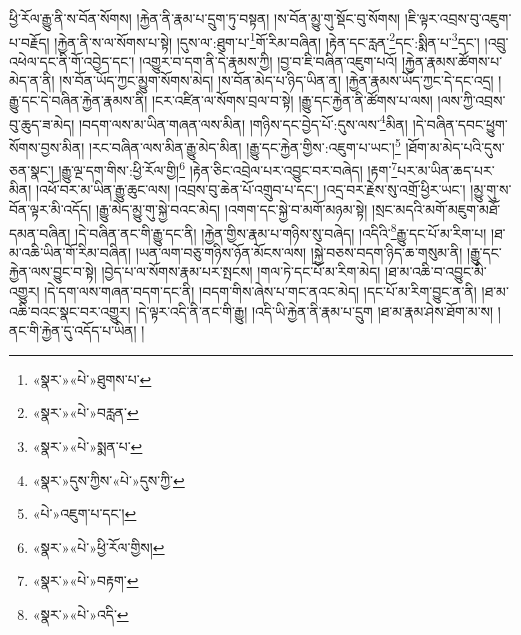 ཕྱི་རོལ་རྒྱུ་ནི་ས་བོན་སོགས། །རྐྱེན་ནི་རྣམ་པ་དྲུག་ཏུ་བསྟན། །ས་བོན་མྱུ་གུ་སྡོང་བུ་སོགས། །ཇི་ལྟར་འབྲས་བུ་འཇུག་པ་བརྗོད། །རྐྱེན་ནི་ས་ལ་སོགས་པ་སྟེ། །དུས་ལ་:ཐུག་པ་\footnote{«སྣར་»«པེ་»ཐུགས་པ་}གོ་རིམ་བཞིན། །རྟེན་དང་རླན་\footnote{«སྣར་»«པེ་»བརླན་}དང་:སྨིན་པ་\footnote{«སྣར་»«པེ་»སྨན་པ་}དང་། །འབྲུ་འཕེལ་དང་ནི་གོ་འབྱེད་དང་། །འགྱུར་བ་དག་ནི་དེ་རྣམས་ཀྱི། །བྱ་བ་ཇི་བཞིན་འཇུག་པའོ། །རྐྱེན་རྣམས་ཚོགས་པ་མེད་ན་ནི། །ས་བོན་ཡོད་ཀྱང་མྱུག་སོགས་མེད། །ས་བོན་མེད་པ་ཉིད་ཡིན་ན། །རྐྱེན་རྣམས་ཡོད་ཀྱང་དེ་དང་འདྲ། །རྒྱུ་དང་དེ་བཞིན་རྐྱེན་རྣམས་ནི། །ངར་འཛིན་ལ་སོགས་བྲལ་བ་སྟེ། །རྒྱུ་དང་རྐྱེན་ནི་ཚོགས་པ་ལས། །ལས་ཀྱི་འབྲས་བུ་ཆུད་ཟ་མེད། །བདག་ལས་མ་ཡིན་གཞན་ལས་མིན། །གཉིས་དང་བྱེད་པོ་:དུས་ལས་\footnote{«སྣར་»དུས་ཀྱིས་«པེ་»དུས་ཀྱི་}མིན། །དེ་བཞིན་དབང་ཕྱུག་སོགས་བྱས་མིན། །རང་བཞིན་ལས་མིན་རྒྱུ་མེད་མིན། །རྒྱུ་དང་རྐྱེན་གྱིས་:འཇུག་པ་ཡང་།\footnote{«པེ་»འཇུག་པ་དང་།} །ཐོག་མ་མེད་པའི་དུས་ཅན་སྣང་། །རྒྱུ་ལྔ་དག་གིས་:ཕྱི་རོལ་གྱི།\footnote{«སྣར་»«པེ་»ཕྱི་རོལ་གྱིས།} །རྟེན་ཅིང་འབྲེལ་པར་འབྱུང་བར་བཞེད། །རྟག་\footnote{«སྣར་»«པེ་»བརྟག་}པར་མ་ཡིན་ཆད་པར་མིན། །འཕོ་བར་མ་ཡིན་རྒྱུ་ཆུང་ལས། །འབྲས་བུ་ཆེན་པོ་འགྲུབ་པ་དང་། །འདྲ་བར་རྗེས་སུ་འགྲོ་ཕྱིར་ཡང་། །མྱུ་གུ་ས་བོན་ལྟར་མི་འདོད། །རྒྱུ་མེད་མྱུ་གུ་སྐྱེ་བའང་མེད། །འགག་དང་སྐྱེ་བ་མགོ་མཉམ་སྟེ། །སྲང་མདའི་མགོ་མཇུག་མཐོ་དམན་བཞིན། །དེ་བཞིན་ནང་གི་རྒྱུ་དང་ནི། །རྐྱེན་གྱིས་རྣམ་པ་གཉིས་སུ་བཞེད། །འདིའི་\footnote{«སྣར་»«པེ་»འདི་}རྒྱུ་དང་པོ་མ་རིག་པ། །ཐ་མ་འཆི་ཡིན་གོ་རིམ་བཞིན། །ཡན་ལག་བཅུ་གཉིས་ཉོན་མོངས་ལས། །སྐྱེ་བཅས་བདག་ཉིད་ཆ་གསུམ་ནི། །རྒྱུ་དང་རྐྱེན་ལས་བྱུང་བ་སྟེ། །བྱེད་པ་ལ་སོགས་རྣམ་པར་སྤངས། །གལ་ཏེ་དང་པོ་མ་རིག་མེད། །ཐ་མ་འཆི་བ་འབྱུང་མི་འགྱུར། །དེ་དག་ལས་གཞན་བདག་དང་ནི། །བདག་གིས་ཞེས་པ་གང་ནའང་མེད། །དང་པོ་མ་རིག་བྱུང་ན་ནི། །ཐ་མ་འཆི་བའང་སྣང་བར་འགྱུར། །དེ་ལྟར་འདི་ནི་ནང་གི་རྒྱུ། །འདི་ཡི་རྐྱེན་ནི་རྣམ་པ་དྲུག །ཐ་མ་རྣམ་ཤེས་ཐོག་མ་ས། །ནང་གི་རྐྱེན་དུ་འདོད་པ་ཡིན། །
